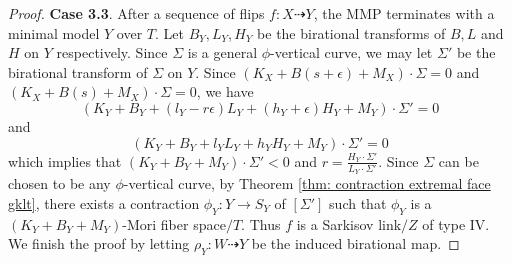 \documentclass[11pt]{amsart}
\numberwithin{equation}{section}
\theoremstyle{definition}
\theoremstyle{remark}
\theoremstyle{definition}
\begin{document}
\begin{proof}
\noindent\textbf{Case 3.3}. After a sequence of flips $f: X\dashrightarrow Y$, the MMP terminates with a minimal model $Y$ over $T$. Let $B_Y,L_Y,H_Y$ be the birational transforms of $B,L$ and $H$ on $Y$ respectively. Since $\Sigma$ is a general $\phi$-vertical curve, we may let $\Sigma'$ be the birational transform of $\Sigma$ on $Y$. Since $(K_{X}+B(s+\epsilon)+M_X)\cdot\Sigma=0$ and $(K_{X}+B(s)+M_X)\cdot\Sigma=0$, we have
$$(K_Y+B_Y+(l_Y-r\epsilon)L_Y+(h_Y+\epsilon)H_Y+M_Y)\cdot\Sigma'=0$$
and
$$(K_Y+B_Y+l_YL_Y+h_YH_Y+M_Y)\cdot\Sigma'=0$$
which implies that $(K_Y+B_Y+M_Y)\cdot\Sigma'<0$ and $r=\frac{H_Y\cdot\Sigma'}{L_Y\cdot\Sigma'}$. Since $\Sigma$ can be chosen to be any $\phi$-vertical curve, by Theorem \ref{thm: contraction extremal face gklt}, there exists a contraction $\phi_Y:Y\rightarrow S_Y$ of $[\Sigma']$ such that $\phi_Y$ is a $(K_Y+B_Y+M_Y)$-Mori fiber space$/T$. Thus $f$ is a Sarkisov link$/Z$ of type IV.  We finish the proof by letting $\rho_Y: W\dashrightarrow Y$ be the induced birational map.
\end{proof}
\end{document}
